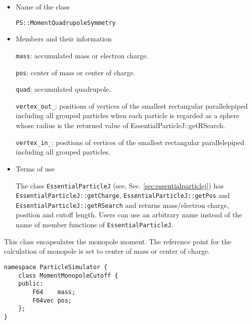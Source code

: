\begin{itemize}

\item Name of the class

  \texttt{PS::MomentQuadrupoleSymmetry}

\item Members and their information

  \texttt{mass}: accumulated mass or electron charge.

  \texttt{pos}: center of mass or center of charge.
        
  \texttt{quad}: accumulated quadrupole.
        
  \texttt{vertex\_out\_}: positions of vertices of the smallest rectangular parallelepiped including all grouped particles when each particle is regarded as a sphere whose radius is the returned value of EssentialParticleJ::getRSearch.
  
  \texttt{vertex\_in\_}: positions of vertices of the smallest rectangular parallelepiped including all grouped particles.

\item Terms of use

  The class \texttt{EssentialParticleJ} (see, Sec. \ref{sec:essentialparticlej}) has \texttt{EssentialParticleJ::getCharge}, \texttt{EssentialParticleJ::getPos} and \texttt{EssentialParticleJ::getRSearch} and returns mass/electron charge, position and cutoff length. Users can use an arbitrary name instead of the name of member functions of \texttt{EssentialParticleJ}.

\end{itemize}


\label{sec:MomentMonopoleCutoff}

This class encapsulates the monopole moment.
The reference point for the calculation of monopole is set to center of mass or center of charge.

\begin{screen}
\begin{verbatim}
namespace ParticleSimulator {
    class MomentMonopoleCutoff {
    public:
        F64    mass;
        F64vec pos;
    };
}
\end{verbatim}
\end{screen}

